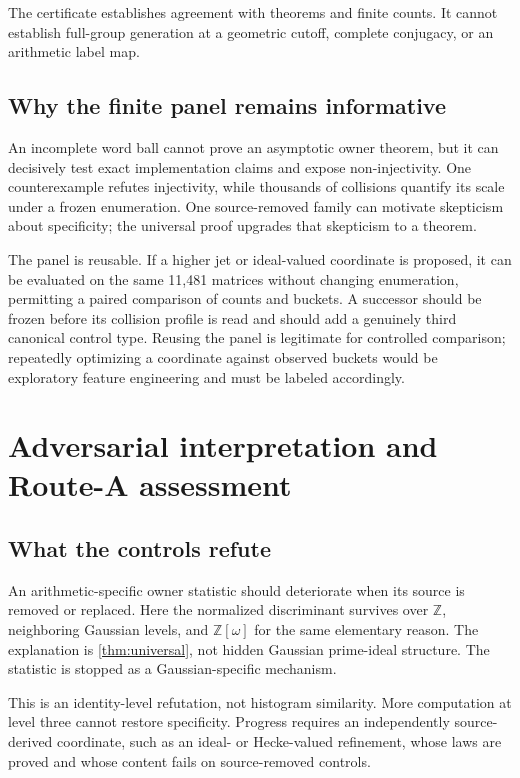 \documentclass[11pt,a4paper]{article}
\theoremstyle{definition}
\theoremstyle{remark}
\newcommand{\Eis}{\mathbb{Z}[\omega]}
\begin{document}
The certificate establishes agreement with theorems and finite counts. It cannot establish full-group generation at a geometric cutoff, complete conjugacy, or an arithmetic label map.

\subsection{Why the finite panel remains informative}

An incomplete word ball cannot prove an asymptotic owner theorem, but it can decisively test exact implementation claims and expose non-injectivity. One counterexample refutes injectivity, while thousands of collisions quantify its scale under a frozen enumeration. One source-removed family can motivate skepticism about specificity; the universal proof upgrades that skepticism to a theorem.

The panel is reusable. If a higher jet or ideal-valued coordinate is proposed, it can be evaluated on the same 11,481 matrices without changing enumeration, permitting a paired comparison of counts and buckets. A successor should be frozen before its collision profile is read and should add a genuinely third canonical control type. Reusing the panel is legitimate for controlled comparison; repeatedly optimizing a coordinate against observed buckets would be exploratory feature engineering and must be labeled accordingly.

\section{Adversarial interpretation and Route-A assessment}

\subsection{What the controls refute}

An arithmetic-specific owner statistic should deteriorate when its source is removed or replaced. Here the normalized discriminant survives over \(\mathbb Z\), neighboring Gaussian levels, and \(\Eis\) for the same elementary reason. The explanation is \cref{thm:universal}, not hidden Gaussian prime-ideal structure. The statistic is stopped as a Gaussian-specific mechanism.

This is an identity-level refutation, not histogram similarity. More computation at level three cannot restore specificity. Progress requires an independently source-derived coordinate, such as an ideal- or Hecke-valued refinement, whose laws are proved and whose content fails on source-removed controls.
\end{document}
